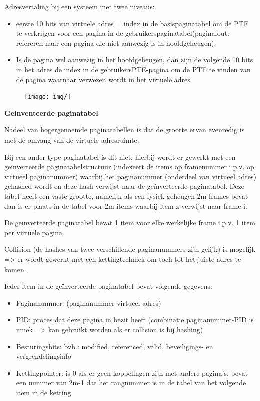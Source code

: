 Adresvertaling bij een systeem met twee niveaus:

\begin{itemize}
\item eerste 10 bits van virtuele adres = index in de basispaginatabel om de PTE te verkrijgen voor een pagina in de gebruikerspaginatabel(paginafout: refereren naar een pagina die niet aanwezig is in hoofdgeheugen).
\item Is de pagina wel aanwezig in het hoofdgeheugen, dan zijn de volgende 10 bits in het adres de index in de gebruikersPTE-pagina om de PTE te vinden van de pagina waarnaar verwezen wordt in het virtuele adres
\end{itemize}

\begin{figure}[htp]
    \centering
            \texttt{[image: img/]}
        \caption{}
    \label{fig:}
\end{figure}

\textbf{Geinventeerde paginatabel}

Nadeel van hogergenoemde paginatabellen is dat de grootte ervan evenredig is met de omvang van de virtuele adresruimte.

Bij een ander type paginatabel is dit niet, hierbij wordt er gewerkt met een geïnverteerde paginatabelstructuur (indexeert de items op framenummer i.p.v. op virtueel paginanummer) waarbij het paginanummer (onderdeel van virtueel adres) gehashed wordt en deze hash verwijst naar de geïnverteerde paginatabel. Deze tabel heeft een vaste grootte, namelijk als een fysiek geheugen 2m   frames bevat dan is er plaats in de tabel voor 2m items waarbij item z verwijst naar frame i.

De geïnverteerde paginatabel bevat 1 item voor elke werkelijke frame i.p.v. 1 item per virtuele pagina.

Collision (de hashes van twee verschillende paginanummers zijn gelijk) is mogelijk => er wordt gewerkt met een kettingtechniek om toch tot het juiste adres te komen.

Ieder item in de geïnverteerde paginatabel bevat volgende gegevens:


\begin{itemize}
\item Paginanummer: (paginanummer virtueel adres)
\item PID: proces dat deze pagina in bezit heeft (combinatie paginanummer-PID is uniek => kan gebruikt worden als er collision is bij hashing)
\item Besturingsbits: bvb.: modified, referenced, valid, beveiligings- en vergrendelingsinfo
\item Kettingpointer: is 0 als er geen koppelingen zijn met andere pagina's. bevat een nummer van 2m-1 dat het rangnummer is in de tabel van het volgende item in de ketting
\end{itemize}

